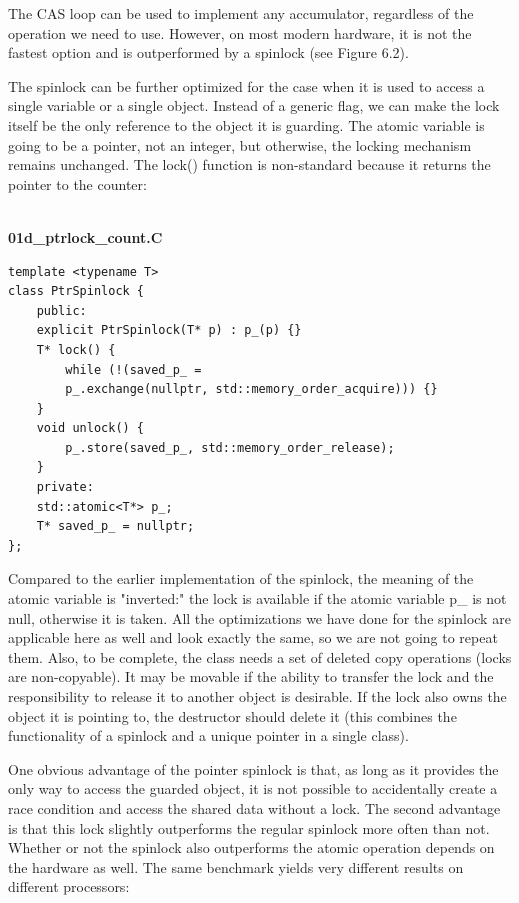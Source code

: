 The CAS loop can be used to implement any accumulator, regardless of the operation we need to use. However, on most modern hardware, it is not the fastest option and is outperformed by a spinlock (see Figure 6.2).

The spinlock can be further optimized for the case when it is used to access a single variable or a single object. Instead of a generic flag, we can make the lock itself be the only reference to the object it is guarding. The atomic variable is going to be a pointer, not an integer, but otherwise, the locking mechanism remains unchanged. The lock() function is non-standard because it returns the pointer to the counter:

\hspace*{\fill} \\ %
\noindent
\textbf{01d\_ptrlock\_count.C}
\begin{lstlisting}[style=styleCXX]
template <typename T>
class PtrSpinlock {
	public:
	explicit PtrSpinlock(T* p) : p_(p) {}
	T* lock() {
		while (!(saved_p_ =
		p_.exchange(nullptr, std::memory_order_acquire))) {}
	}
	void unlock() {
		p_.store(saved_p_, std::memory_order_release);
	}
	private:
	std::atomic<T*> p_;
	T* saved_p_ = nullptr;
};
\end{lstlisting}

Compared to the earlier implementation of the spinlock, the meaning of the atomic variable is "inverted:" the lock is available if the atomic variable p\_ is not null, otherwise it is taken. All the optimizations we have done for the spinlock are applicable here as well and look exactly the same, so we are not going to repeat them. Also, to be complete, the class needs a set of deleted copy operations (locks are non-copyable). It may be movable if the ability to transfer the lock and the responsibility to release it to another object is desirable. If the lock also owns the object it is pointing to, the destructor should delete it (this combines the functionality of a spinlock and a unique pointer in a single class).

One obvious advantage of the pointer spinlock is that, as long as it provides the only way to access the guarded object, it is not possible to accidentally create a race condition and access the shared data without a lock. The second advantage is that this lock slightly outperforms the regular spinlock more often than not. Whether or not the spinlock also outperforms the atomic operation depends on the hardware as well. The same benchmark yields very different results on different processors:

